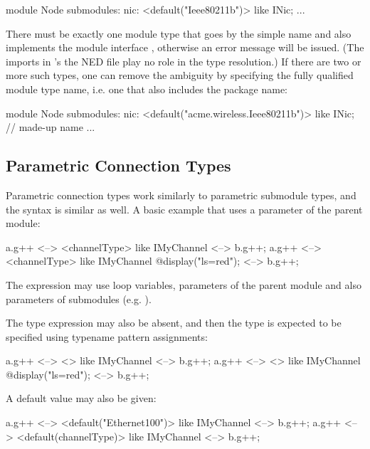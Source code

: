 \begin{ned}
module Node
{
    submodules:
        nic: <default("Ieee80211b")> like INic;
        ...
}
\end{ned}

There must be exactly one module type that goes by the simple name 
and also implements the module interface , otherwise an error message
will be issued. (The imports in 's the NED file play no role in the
type resolution.)  If there are two or more such types, one can remove the ambiguity
by specifying the fully qualified module type name, i.e. one that also includes
the package name:

\begin{ned}
module Node
{
    submodules:
        nic: <default("acme.wireless.Ieee80211b")> like INic; // made-up name
        ...
}
\end{ned}





\subsection{Parametric Connection Types}
\label{sec:ned-lang:connection-like}

Parametric connection types work similarly to parametric submodule types,
and the syntax is similar as well. A basic example that uses a parameter of
the parent module:

\begin{ned}
a.g++ <--> <channelType> like IMyChannel <--> b.g++;
a.g++ <--> <channelType> like IMyChannel {@display("ls=red");} <--> b.g++;
\end{ned}

The expression may use loop variables, parameters of the parent module
and also parameters of submodules (e.g. ).

The type expression may also be absent, and then the type is expected to be
specified using typename pattern assignments:

\begin{ned}
a.g++ <--> <> like IMyChannel <--> b.g++;
a.g++ <--> <> like IMyChannel {@display("ls=red");} <--> b.g++;
\end{ned}

A default value may also be given:

\begin{ned}
a.g++ <--> <default("Ethernet100")> like IMyChannel <--> b.g++;
a.g++ <--> <default(channelType)> like IMyChannel <--> b.g++;
\end{ned}


